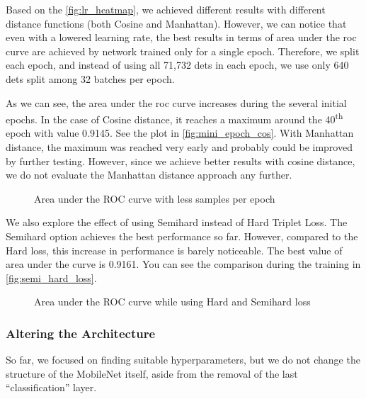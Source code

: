 Based on the \autoref{fig:lr_heatmap}, we achieved different results with different distance functions (both Cosine and Manhattan). However, we can notice that even with a lowered learning rate, the best results in terms of area under the \gls{roc} curve are achieved by network trained only for a single epoch. Therefore, we split each epoch, and instead of using all 71,732 \glspl{det} in each epoch, we use only 640 \glspl{det} split among 32 batches per epoch.

As we can see, the area under the \gls{roc} curve increases during the several initial epochs. In the case of Cosine distance, it reaches a maximum around the 40\textsuperscript{th} epoch with value 0.9145. See the plot in \autoref{fig:mini_epoch_cos}. With Manhattan distance, the maximum was reached very early and probably could be improved by further testing. However, since we achieve better results with cosine distance, we do not evaluate the Manhattan distance approach any further.

\begin{figure}
    \centering
    \def\svgwidth{\columnwidth}
    
    \caption{Area under the ROC curve with less samples per epoch}
    \label{fig:mini_epoch_cos}
\end{figure}

We also explore the effect of using Semihard instead of Hard Triplet Loss. The Semihard option achieves the best performance so far. However, compared to the Hard loss, this increase in performance is barely noticeable. The best value of area under the curve is 0.9161. You can see the comparison during the training in \autoref{fig:semi_hard_loss}.

\begin{figure}
    \centering
    \def\svgwidth{\columnwidth}
    
    \caption{Area under the ROC curve while using Hard and Semihard loss}
    \label{fig:semi_hard_loss}
\end{figure}

\subsubsection{Altering the Architecture}

{\color{red}
So far, we focused on finding suitable hyperparameters, but we do not change the structure of the MobileNet itself, aside from the removal of the last ``classification'' layer. 
}

